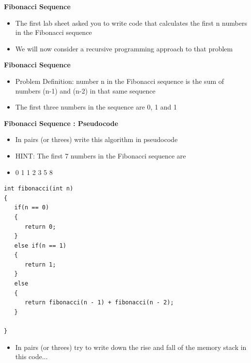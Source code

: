 \documentclass{beamer}
\begin{document}
\begin{frame}
 
\textbf{Fibonacci Sequence}
 
\begin{itemize}
\item The first lab sheet asked you to write code that calculates the first n numbers in the Fibonacci sequence 
\item We will now consider a recursive programming approach to that problem
\end{itemize}
\end{frame}

\begin{frame}
 
\textbf{Fibonacci Sequence}
 
\begin{itemize}
\item Problem Definition: number n in the Fibonacci sequence is the sum of numbers (n-1) and (n-2) in that same sequence
\item The first three numbers in the sequence are 0, 1 and 1
\end{itemize}
\end{frame}

\begin{frame}
 
\textbf{Fibonacci Sequence : Pseudocode}
 
\begin{itemize}
\item In pairs (or threes) write this algorithm in pseudocode
\bigskip
\item HINT: The first 7 numbers in the Fibonacci sequence are 
\item 0  1  1  2  3  5  8
\end{itemize}
\end{frame}

\begin{frame}[fragile]
\begin{block}{}
\begin{lstlisting}
int fibonacci(int n)
{ 
   if(n == 0)
   {
      return 0;
   }
   else if(n == 1)
   {
      return 1;
   }
   else
   {
      return fibonacci(n - 1) + fibonacci(n - 2);
   }

}
\end{lstlisting}
\end{block}

\end{frame}

\begin{frame}[fragile]
\begin{itemize}
\item In pairs (or threes) try to write down the rise and fall of the memory stack in this code...
\end{itemize}
\end{frame}
\end{document}
